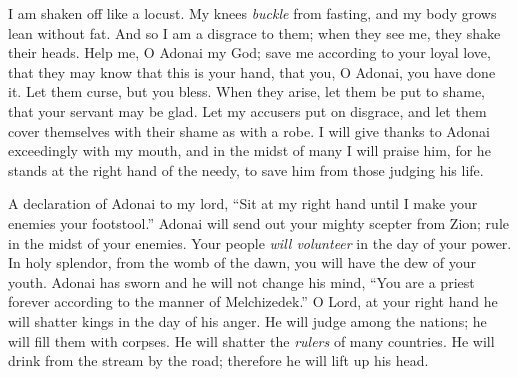 \begin{biblechapter}
I am shaken off like a locust.
\verse My knees \textit{buckle} from fasting, 
and my body grows lean without fat.
\verse And so I am a disgrace to them; 
when they see me, they shake their heads.
\verse Help me, O Adonai my God; 
save me according to your loyal love,
\verse that they may know that this is your hand, 
that you, O Adonai, you have done it.
\verse Let them curse, but you bless. 
When they arise, let them be put to shame, 
that your servant may be glad.
\verse Let my accusers put on disgrace, 
and let them cover themselves with their shame as with a robe.
\verse I will give thanks to Adonai exceedingly with my mouth, 
and in the midst of many I will praise him,
\verse for he stands at the right hand of the needy, 
to save him from those judging his life.
\end{biblechapter}

\begin{biblechapter} %
 A declaration of Adonai to my lord, 
“Sit at my right hand 
until I make your enemies your footstool.”
\verse Adonai will send out your mighty scepter from Zion; 
rule in the midst of your enemies.
\verse Your people \textit{will volunteer} in the day of your power. 
In holy splendor, from the womb of the dawn, 
you will have the dew of your youth.
\verse Adonai has sworn and he will not change his mind, 
“You are a priest forever 
according to the manner of Melchizedek.”
\verse O Lord, at your right hand 
he will shatter kings in the day of his anger.
\verse He will judge among the nations; 
he will fill them with corpses. 
He will shatter the \textit{rulers} of many countries.
\verse He will drink from the stream by the road; 
therefore he will lift up his head.
\end{biblechapter}

